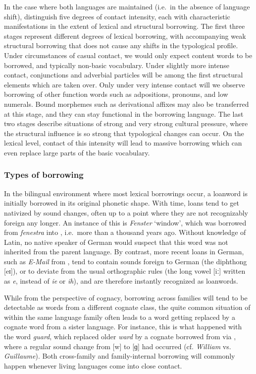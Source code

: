 In the case where both languages are maintained (i.e.\ in the absence of language shift), \citet{thomason_kaufman_1988} distinguish five degrees of contact intensity, each with characteristic manifestations in the extent of lexical and structural borrowing. The first three stages represent different degrees of lexical borrowing, with accompanying weak structural borrowing that does not cause any shifts in the typological profile. Under circumstances of casual contact, we would only expect content words to be borrowed, and typically non-basic vocabulary. Under slightly more intense contact, conjunctions and adverbial particles will be among the first structural elements which are taken over. Only under very intense contact will we observe borrowing of other function words such as adpositions, pronouns, and low numerals. Bound morphemes such as derivational affixes may also be transferred at this stage, and they can stay functional in the borrowing language. The last two stages describe situations of strong 
and very strong cultural pressure, where the structural influence is so strong that typological changes can occur. On the lexical level, contact of this intensity will lead to massive borrowing which can even replace large parts of the basic vocabulary.

\subsubsection{Types of borrowing}
In the bilingual environment where most lexical borrowings occur, a loanword is initially borrowed in its original phonetic shape. With time, loans tend to get nativized by sound changes, often up to a point where they are not recognizably foreign any longer. An instance of this is  \textit{Fenster} `window', which was borrowed from  \textit{fenestra} into , i.e.\ more than a thousand years ago. Without knowledge of Latin, no native speaker of German would suspect that this word was not inherited from the parent language. By contrast, more recent loans in German, such as \textit{E-Mail} from , tend to contain sounds foreign to German (the diphthong [eɪ]), or to deviate from the usual orthographic rules (the long vowel [iː] written as \textit{e}, instead of \textit{ie} or \textit{ih}), and are therefore instantly recognized as loanwords.

While from the perspective of cognacy, borrowing across families will tend to be detectable as words from a different cognate class, the quite common situation of  within the same language family often leads to a word getting replaced by a cognate word from a sister language. For instance, this is what happened with the  word \textit{guard}, which replaced older \textit{ward} by a cognate borrowed from  via , where a regular sound change from [w] to [ɡ] had occurred (cf. \textit{William} vs. \textit{Guillaume}). Both cross-family and family-internal borrowing will commonly happen whenever living languages come into close contact.

